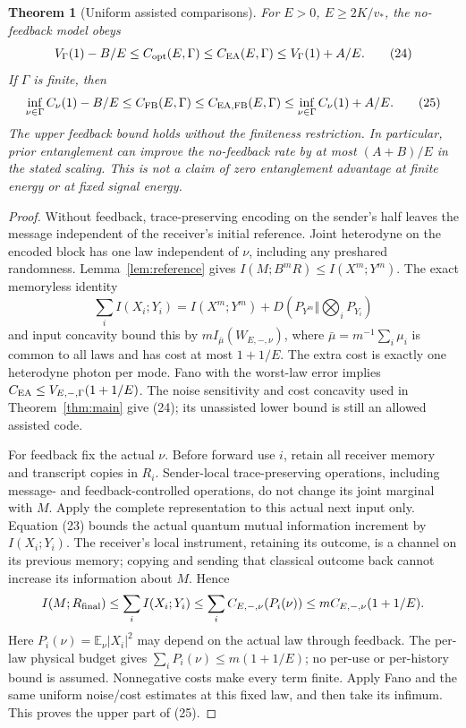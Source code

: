 \documentclass[11pt]{article}
\newtheorem{theorem}{Theorem}
\newcommand{\E}{\mathbb E}
\newcommand{\capq}{C_{\mathrm{opt}}}
\begin{document}
\begin{theorem}[Uniform assisted comparisons]\label{thm:assisted}
For \(E>0\), \(E\geq2K/v_*\), the no-feedback model obeys
\[
 V_\Gamma(1)-B/E\leq\capq(E,\Gamma)
 \leq C_{\rm EA}(E,\Gamma)\leq V_\Gamma(1)+A/E.       \tag{24}
\]
If \(\Gamma\) is finite, then
\[
 \inf_{\nu\in\Gamma}C_\nu(1)-B/E
 \leq C_{\rm FB}(E,\Gamma)\leq C_{\rm EA,FB}(E,\Gamma)
 \leq\inf_{\nu\in\Gamma}C_\nu(1)+A/E.              \tag{25}
\]
The upper feedback bound holds without the finiteness restriction.
In particular, prior entanglement can improve the no-feedback rate by
at most \((A+B)/E\) in the stated scaling. This is not a claim of zero
entanglement advantage at finite energy or at fixed signal energy.
\end{theorem}
\begin{proof}
Without feedback, trace-preserving encoding on the sender's half leaves
the message independent of the receiver's initial reference. Joint
heterodyne on the encoded block has one law independent of \(\nu\),
including any preshared randomness. Lemma~\ref{lem:reference} gives
\(I(M;B^mR)\leq I(X^m;Y^m)\).
The exact memoryless identity
\[
 \sum_i I(X_i;Y_i)=I(X^m;Y^m)
    +D(P_{Y^m}\Vert\textstyle\bigotimes_iP_{Y_i})
\]
and input concavity bound this by \(mI_{\bar\mu}(W_{E,-,\nu})\), where
\(\bar\mu=m^{-1}\sum_i\mu_i\) is common to all laws and has cost at most
\(1+1/E\). The extra cost is exactly one heterodyne photon per mode.
Fano with the worst-law error implies
\(C_{\rm EA}\leq V_{E,-,\Gamma}(1+1/E)\).
The noise sensitivity and cost concavity used in Theorem~\ref{thm:main}
give (24); its unassisted lower bound is still an allowed assisted code.

For feedback fix the actual \(\nu\). Before forward use \(i\), retain
all receiver memory and transcript copies in \(R_i\). Sender-local
trace-preserving operations, including message- and feedback-controlled
operations, do not change its joint marginal with \(M\). Apply the
complete representation to this actual next input only. Equation (23)
bounds the actual quantum mutual information increment by \(I(X_i;Y_i)\).
The receiver's local instrument, retaining its outcome, is a channel on
its previous memory; copying and sending that classical outcome back
cannot increase its information about \(M\). Hence
\[
 I(M;R_{\rm final})\leq\sum_i I(X_i;Y_i)
 \leq\sum_i C_{E,-,\nu}(P_i(\nu))
 \leq m C_{E,-,\nu}(1+1/E).
\]
Here \(P_i(\nu)=\E_\nu|X_i|^2\) may depend on the actual law through
feedback. The per-law physical budget gives
\(\sum_iP_i(\nu)\leq m(1+1/E)\); no per-use or per-history bound is
assumed. Nonnegative costs make every term finite. Apply Fano and the
same uniform noise/cost estimates at this fixed law, and then take its
infimum. This proves the upper part of (25).


\end{proof}
\end{document}

